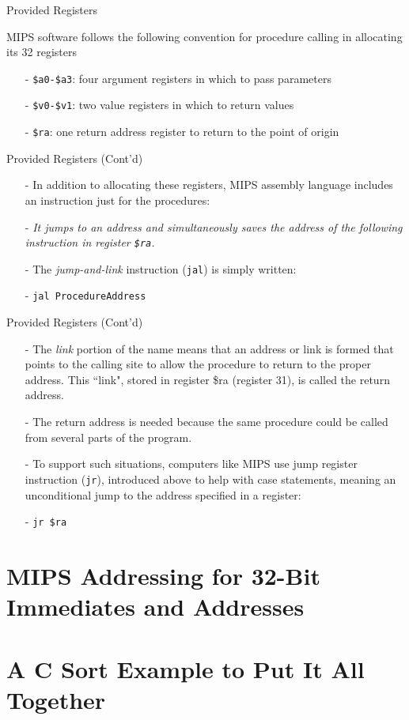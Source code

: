\begin{frame}{Provided Registers}
\begin{flushleft}
MIPS software follows the following convention for procedure calling in allocating its 32 registers
\end{flushleft}

\begin{itemize}
\item[-]
\texttt{\$a0-\$a3}: four argument registers in which to pass parameters
\item[-] \texttt{\$v0-\$v1}: two value registers in which to return values
\item[-] \texttt{\$ra}: one return address register to return to the point of origin    
\end{itemize}
\end{frame}

\begin{frame}{Provided Registers (Cont'd)}
\begin{itemize}
\item[-] In addition to allocating these registers, MIPS assembly language includes an instruction just for the procedures: 

\item[-]\textit{It jumps to an address and simultaneously saves the address of the following instruction in register \texttt{\$ra}.} 

\item[-]The \textit{jump-and-link} instruction (\texttt{jal}) is simply written:

\item[-] \texttt{jal ProcedureAddress}
\end{itemize}
\end{frame}

\begin{frame}{Provided Registers (Cont'd)}
\begin{itemize}
\item[-] 
The \textit{link} portion of the name means that an address or link is formed that points to
the calling site to allow the procedure to return to the proper address. This ``link",
stored in register \$ra (register 31), is called the return address. 

\item[-] The return address
is needed because the same procedure could be called from several parts of the
program.

\item[-]To support such situations, computers like MIPS use jump register instruction
(\texttt{jr}), introduced above to help with case statements, meaning an unconditional
jump to the address specified in a register:

\item[-] \texttt{jr \$ra}
\end{itemize}
\end{frame}
\section{MIPS Addressing for 32-Bit Immediates and Addresses}
\section{A C Sort Example to Put It All Together}